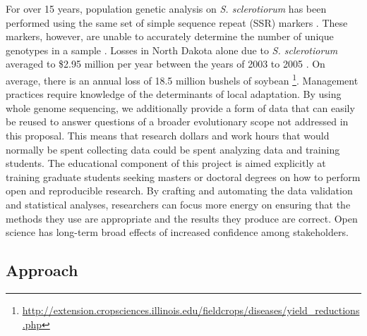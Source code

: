 \documentclass[12pt,letterpaper]{article}
\begin{document}
For over 15 years, population genetic analysis on \textit{S. sclerotiorum} has been performed using the same set of simple sequence repeat (SSR) markers \citep{sirjusingh2001characterization}. 
These markers, however, are unable to accurately determine the number of unique genotypes in a sample \citep{lehner2017independently,lehner2017sclerotinia,arnaud2007standardizing}.
Losses in North Dakota alone due to \textit{S. sclerotiorum} averaged to \$2.95 million per year between the years of 2003 to 2005 \cite{ramasubramaniam2008estimates}. On average, there is an annual loss of 18.5 million bushels of soybean \footnote{\url{http://extension.cropsciences.illinois.edu/fieldcrops/diseases/yield_reductions.php}}.
Management practices require knowledge of the determinants of local adaptation. 
By using whole genome sequencing, we additionally provide a form of data that can easily be reused to answer questions of a broader evolutionary scope not addressed in this proposal. 
This means that research dollars and work hours that would normally be spent collecting data could be spent analyzing data and training students. 
The educational component of this project is aimed explicitly at training graduate students seeking masters or doctoral degrees on how to perform open and reproducible research. 
By crafting and automating the data validation and statistical analyses, researchers can focus more energy on ensuring that the methods they use are appropriate and the results they produce are correct. 
Open science has long-term broad effects of increased confidence among stakeholders. 




\subsection{Approach}



 
\end{document}

